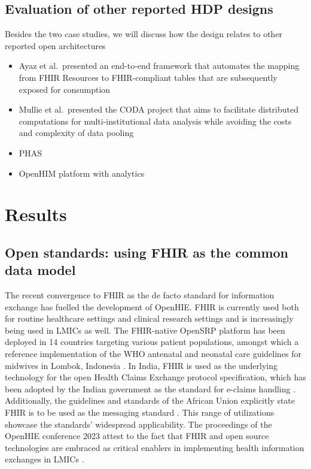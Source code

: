\documentclass[
  authoryear]{elsarticle}
\providecommand{\tightlist}{%
  \setlength{\itemsep}{0pt}\setlength{\parskip}{0pt}}\usepackage{longtable,booktabs,array}
\begin{document}
\subsection{Evaluation of other reported HDP
designs}\label{evaluation-of-other-reported-hdp-designs}

Besides the two case studies, we will discuss how the design relates to
other reported open architectures

\begin{itemize}
\tightlist
\item
  Ayaz et al.~presented an end-to-end framework that automates the
  mapping from FHIR Resources to FHIR-compliant tables that are
  subsequently exposed for consumption \citep{ayaz2023transforming}
\item
  Mullie et al.~presented the CODA project that aims to facilitate
  distributed computations for multi-institutional data analysis while
  avoiding the costs and complexity of data pooling
  \citep{mullie2023coda}
\item
  PHAS \citep{abbasian2023phas}
\item
  OpenHIM platform with analytics
\end{itemize}

\section{Results}\label{results}

\subsection{Open standards: using FHIR as the common data
model}\label{open-standards-using-fhir-as-the-common-data-model}

The recent convergence to FHIR as the de facto standard for information
exchange has fuelled the development of OpenHIE. FHIR is currently used
both for routine healthcare settings\citep{ayaz2021fast} and clinical
research settings \citep{duda2022hl7, vorisek2022fast} and is
increasingly being used in LMICs as well. The FHIR-native OpenSRP
platform \citep{mehl2020open} has been deployed in 14 countries
targeting various patient populations, amongst which a reference
implementation of the WHO antenatal and neonatal care guidelines for
midwives in Lombok, Indonesia
\citep{summitinstitutefordevelopment2023bunda, kurniawan2019midwife}. In
India, FHIR is used as the underlying technology for the open Health
Claims Exchange protocol specification, which has been adopted by the
Indian government as the standard for e-claims handling \citep{hcx}.
Additionally, the guidelines and standards of the African Union
explicitly state FHIR is to be used as the messaging standard
\citep{2023african}. This range of utilizations showcase the standards'
widespread applicability. The proceedings of the OpenHIE conference 2023
attest to the fact that FHIR and open source technologies are embraced
as critical enablers in implementing health information exchanges in
LMICs \citep{ohie23}.
\end{document}
